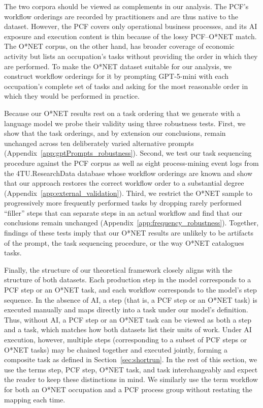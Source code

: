 The two corpora should be viewed as complements in our analysis.
The PCF's workflow orderings are recorded by practitioners and are thus native to the dataset.
However, the PCF covers only operational business processes, and its AI exposure and execution content is thin because of the lossy PCF--O*NET match.
The O*NET corpus, on the other hand, has broader coverage of economic activity but lists an occupation's tasks without providing the order in which they are performed.
To make the O*NET dataset suitable for our analysis, we construct workflow orderings for it by prompting GPT-5-mini \citep[through Expected Parrot;][]{Horton2024EDSL} with each occupation's complete set of tasks and asking for the most reasonable order in which they would be performed in practice.

Because our O*NET results rest on a task ordering that we generate with a language model we probe their validity using three robustness tests.
First, we show that the task orderings, and by extension our conclusions, remain unchanged across ten deliberately varied alternative prompts (Appendix~\ref{app:gptPrompts_robustness}).
Second, we test our task sequencing procedure against the PCF corpus as well as eight process-mining event logs from the 4TU.ResearchData database \citep{roadfines_log, sepsis_log, bpi2017_log, bpi2020_log} whose workflow orderings are known and show that our approach restores the correct workflow order to a substantial degree (Appendix~\ref{app:external_validation}).
Third, we restrict the O*NET sample to progressively more frequently performed tasks by dropping rarely performed ``filler'' steps that can separate steps in an actual workflow and find that our conclusions remain unchanged (Appendix~\ref{app:frequency_robustness}).
Together, findings of these tests imply that our O*NET results are unlikely to be artifacts of the prompt, the task sequencing procedure, or the way O*NET catalogues tasks.

Finally, the structure of our theoretical framework closely aligns with the structure of both datasets.
Each production step in the model corresponds to a PCF step or an O*NET task, and each workflow corresponds to the model's step sequence.
In the absence of AI, a step (that is, a PCF step or an O*NET task) is executed manually and maps directly into a task under our model's definition.
Thus, without AI, a PCF step or an O*NET task can be viewed as both a step and a task, which matches how both datasets list their units of work.
Under AI execution, however, multiple steps (corresponding to a subset of PCF steps or O*NET tasks) may be chained together and executed jointly, forming a composite task as defined in Section~\ref{sec:shortrun}.
In the rest of this section, we use the terms step, PCF step, O*NET task, and task interchangeably and expect the reader to keep these distinctions in mind.
We similarly use the term workflow for both an O*NET occupation and a PCF process group without restating the mapping each time.


